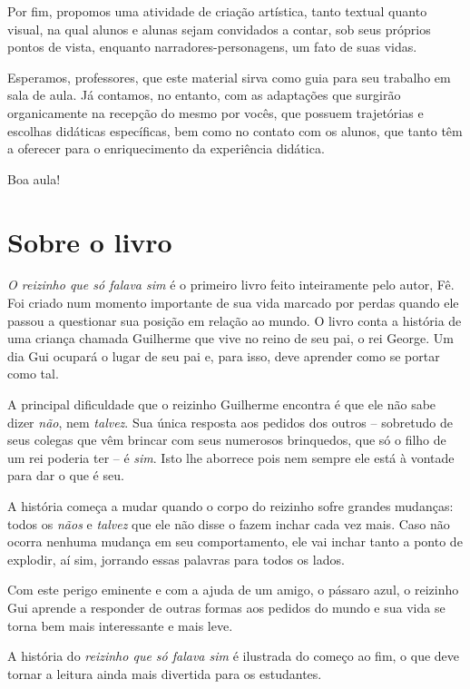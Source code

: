 \documentclass[11pt]{extarticle}
\begin{document}
Por fim, propomos uma atividade de criação artística, tanto textual quanto visual, 
na qual alunos e alunas sejam convidados a contar, sob seus próprios
pontos de vista, enquanto narradores-personagens, um fato de suas vidas. 

Esperamos, professores, que este material sirva como guia 
para seu trabalho em sala de aula. Já contamos, no entanto, com as adaptações
que surgirão organicamente na recepção do mesmo por vocês, que possuem 
trajetórias e escolhas didáticas específicas, bem como no contato com os 
alunos, que tanto têm a oferecer para o enriquecimento da experiência didática.

Boa aula!


\section{Sobre o livro}

\textit{O reizinho que só falava sim} é o primeiro livro feito inteiramente pelo autor, Fê.
Foi criado num momento importante de sua vida marcado por perdas quando ele 
passou a questionar sua posição em relação ao mundo. O livro conta a história de uma criança chamada Guilherme
que vive no reino de seu pai, o rei George. Um dia Gui ocupará o lugar de seu pai e,
para isso, deve aprender como se portar como tal. 

A principal dificuldade que o reizinho Guilherme encontra é que ele não sabe dizer \textit{não},
nem \textit{talvez}. Sua única resposta aos pedidos dos outros -- sobretudo de seus colegas
que vêm brincar com seus numerosos brinquedos, que só o filho de um rei poderia ter -- 
é \textit{sim}. Isto lhe aborrece pois nem sempre ele está à vontade para dar o que é seu. 

A história começa a mudar quando o corpo do reizinho sofre grandes mudanças:
todos os \textit{nãos} e \textit{talvez} que ele não disse o fazem inchar
cada vez mais. Caso não ocorra nenhuma mudança em seu comportamento, 
ele vai inchar tanto a ponto de explodir, aí sim, jorrando essas palavras
para todos os lados. 

Com este perigo eminente e com a ajuda de um amigo, o pássaro azul,
o reizinho Gui aprende a responder de outras formas aos pedidos
do mundo e sua vida se torna bem mais interessante e mais leve.

A história do \textit{reizinho que só falava sim} é ilustrada do começo ao fim,
o que deve tornar a leitura ainda mais divertida para os estudantes. 
\end{document}
